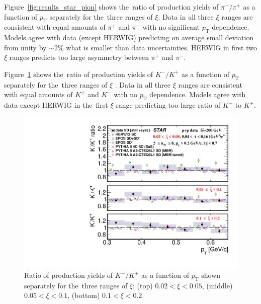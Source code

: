 Figure~\ref{fig:results_star_pion} shows the~ratio of production yields of $\pi^-/\pi^+$ as a function of $p_\textrm{T}$  separately for the~three ranges of $\xi$. Data in all three $\xi$ ranges are consistent with equal amounts of $\pi^+$ and $\pi^-$ with no significant $p_\textrm{T}$ dependence. Models agree with data (except HERWIG) predicting on average small deviation from unity by $\sim2\%$ what is smaller than data uncertainties. HERWIG in first two $\xi$ ranges predicts too large asymmetry between $\pi^+$ and $\pi^-$.

Figure~\ref{fig:results_star_kaon} shows the~ratio of production yields of $K^- / K^+$ as a function of $p_\textrm{T}$  separately for the~three ranges of $\xi$ . Data in all three $\xi$  ranges are consistent with equal amounts of $K^+$ and $K^-$ with no $p_\textrm{T}$ dependence. Models agree with data except HERWIG in the~first $\xi$  range predicting too large ratio of $K^-$ to $K^+$.
\begin{figure}[h!]
	\centering
	\includegraphics[width=.99\textwidth,page=1]{chapters/chrgSTAR/img/results/particleRatio_prt_1.pdf}
	\caption{Ratio of production yields of $K^-/K^+$ as a function of $p_\textrm{T}$ shown separately for the~three ranges of $\xi$: (top) $0.02<\xi<0.05$, (middle) $0.05<\xi<0.1$, (bottom) $0.1<\xi<0.2$.}
	\label{fig:results_star_kaon}
	
\end{figure}

